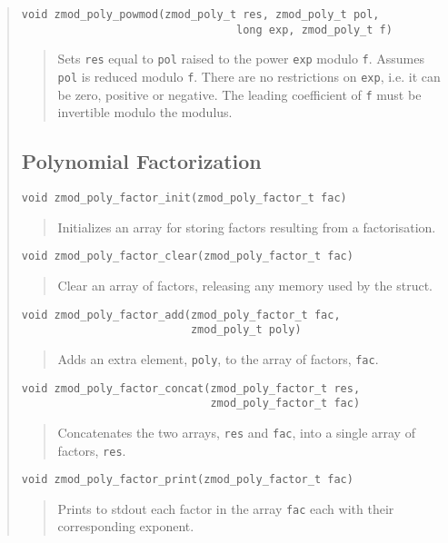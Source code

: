 \documentclass[a4paper,10pt]{article}
\newcommand{\code}{\lstinline}
\begin{document}
\begin{quote}
\begin{lstlisting}
void zmod_poly_powmod(zmod_poly_t res, zmod_poly_t pol,
                                 long exp, zmod_poly_t f)
\end{lstlisting}
\begin{quote}
Sets \code{res} equal to \code{pol} raised to the power \code{exp} modulo \code{f}.  Assumes \code{pol} is reduced modulo \code{f}.  There are no restrictions on \code{exp}, i.e. it can be zero, positive or negative.  The leading coefficient of \code{f} must be invertible modulo the modulus. 
\end{quote}

\subsection{Polynomial Factorization}

\begin{lstlisting}
void zmod_poly_factor_init(zmod_poly_factor_t fac)
\end{lstlisting}
\begin{quote}
Initializes an array for storing factors resulting from a factorisation.  \end{quote}

\begin{lstlisting}
void zmod_poly_factor_clear(zmod_poly_factor_t fac)
\end{lstlisting}
\begin{quote}
Clear an array of factors, releasing any memory used by the struct.
\end{quote}

\begin{lstlisting}
void zmod_poly_factor_add(zmod_poly_factor_t fac,
                          zmod_poly_t poly)
\end{lstlisting}
\begin{quote}
Adds an extra element, \code{poly}, to the array of factors, \code{fac}.  
\end{quote}

\begin{lstlisting}
void zmod_poly_factor_concat(zmod_poly_factor_t res,
                             zmod_poly_factor_t fac)
\end{lstlisting}
\begin{quote}
Concatenates the two arrays, \code{res} and \code{fac}, into a single array of factors, \code{res}.  
\end{quote}

\begin{lstlisting}
void zmod_poly_factor_print(zmod_poly_factor_t fac)
\end{lstlisting}
\begin{quote}
Prints to stdout each factor in the array \code{fac} each with their corresponding exponent.
\end{quote}


\end{quote}
\end{document}
